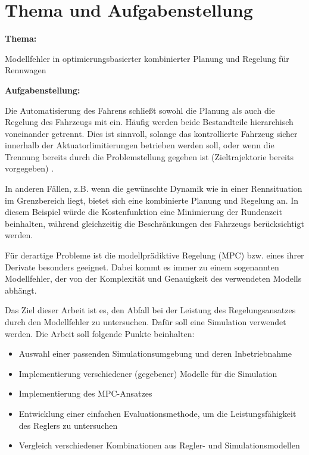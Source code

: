  

\chapter*{Thema und Aufgabenstellung}
\textbf{Thema:}\par\smallskip

 Modellfehler in optimierungsbasierter kombinierter Planung und Regelung für Rennwagen

\textbf{Aufgabenstellung:}\par\smallskip
\par\smallskip  
Die Automatisierung des Fahrens schließt sowohl die Planung als auch die Regelung des Fahrzeugs mit ein. Häufig werden beide Bestandteile hierarchisch voneinander getrennt. Dies ist sinnvoll, solange das kontrollierte Fahrzeug sicher innerhalb der Aktuatorlimitierungen betrieben werden soll, oder wenn die Trennung bereits durch die Problemstellung gegeben ist (Zieltrajektorie bereits vorgegeben) \cite{Williams2016AggressiveDW}.  

In anderen Fällen, z.B. wenn die gewünschte Dynamik wie in einer Rennsituation im Grenzbereich liegt, bietet sich eine kombinierte Planung und Regelung an. In diesem Beispiel würde die Kostenfunktion eine Minimierung der Rundenzeit beinhalten, während gleichzeitig die Beschränkungen des Fahrzeugs berücksichtigt werden.

Für derartige Probleme ist die modellprädiktive Regelung (MPC) bzw. eines ihrer Derivate besonders geeignet. Dabei kommt es immer zu einem sogenannten Modellfehler, der von der Komplexität und Genauigkeit des verwendeten Modells abhängt.

Das Ziel dieser Arbeit ist es, den Abfall bei der Leistung des Regelungsansatzes durch den Modellfehler zu untersuchen. Dafür soll eine Simulation verwendet werden.
Die Arbeit soll folgende Punkte beinhalten:
\begin{itemize}
\item Auswahl einer passenden Simulationsumgebung und deren Inbetriebnahme
\item Implementierung verschiedener (gegebener) Modelle für die Simulation
\item Implementierung des MPC-Ansatzes
\item Entwicklung einer einfachen Evaluationsmethode, um die Leistungsfähigkeit des Reglers zu untersuchen
\item Vergleich verschiedener Kombinationen aus Regler- und Simulationsmodellen
\end{itemize}